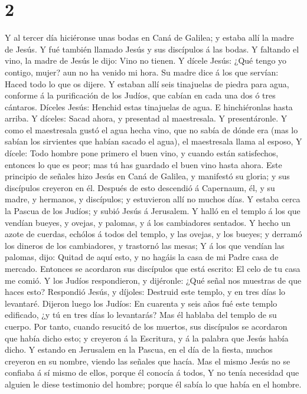 \hypertarget{section-1}{%
\section{2}\label{section-1}}

 Y al tercer día hiciéronse unas bodas en Caná de Galilea;
y estaba allí la madre de Jesús.  Y fué también llamado
Jesús y sus discípulos á las bodas.  Y faltando el vino,
la madre de Jesús le dijo: Vino no tienen.  Y dícele
Jesús: ¿Qué tengo yo contigo, mujer? aun no ha venido mi hora.
 Su madre dice á los que servían: Haced todo lo que os
dijere.  Y estaban allí seis tinajuelas de piedra para
agua, conforme á la purificación de los Judíos, que cabían en cada una
dos ó tres cántaros.  Díceles Jesús: Henchid estas
tinajuelas de agua. E hinchiéronlas hasta arriba.  Y
díceles: Sacad ahora, y presentad al maestresala. Y presentáronle.
 Y como el maestresala gustó el agua hecha vino, que no
sabía de dónde era (mas lo sabían los sirvientes que habían sacado el
agua), el maestresala llama al esposo,  Y dícele: Todo
hombre pone primero el buen vino, y cuando están satisfechos, entonces
lo que es peor; mas tú has guardado el buen vino hasta ahora.
 Este principio de señales hizo Jesús en Caná de Galilea,
y manifestó su gloria; y sus discípulos creyeron en él. 
Después de esto descendió á Capernaum, él, y su madre, y hermanos, y
discípulos; y estuvieron allí no muchos días.  Y estaba
cerca la Pascua de los Judíos; y subió Jesús á Jerusalem.
 Y halló en el templo á los que vendían bueyes, y ovejas,
y palomas, y á los cambiadores sentados.  Y hecho un
azote de cuerdas, echólos á todos del templo, y las ovejas, y los
bueyes; y derramó los dineros de los cambiadores, y trastornó las mesas;
 Y á los que vendían las palomas, dijo: Quitad de aquí
esto, y no hagáis la casa de mi Padre casa de mercado. 
Entonces se acordaron sus discípulos que está escrito: El celo de tu
casa me comió.  Y los Judíos respondieron, y dijéronle:
¿Qué señal nos muestras de que haces esto?  Respondió
Jesús, y díjoles: Destruid este templo, y en tres días lo levantaré.
 Dijeron luego los Judíos: En cuarenta y seis años fué
este templo edificado, ¿y tú en tres días lo levantarás? 
Mas él hablaba del templo de su cuerpo.  Por tanto,
cuando resucitó de los muertos, sus discípulos se acordaron que había
dicho esto; y creyeron á la Escritura, y á la palabra que Jesús había
dicho.  Y estando en Jerusalem en la Pascua, en el día de
la fiesta, muchos creyeron en su nombre, viendo las señales que hacía.
 Mas el mismo Jesús no se confiaba á sí mismo de ellos,
porque él conocía á todos,  Y no tenía necesidad que
alguien le diese testimonio del hombre; porque él sabía lo que había en
el hombre.

